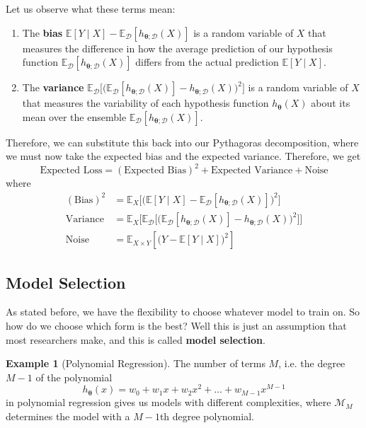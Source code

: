 \documentclass{article}
\theoremstyle{definition}
\newtheorem{example}{Example}[section]
\theoremstyle{remark}
\theoremstyle{definition}
\begin{document}
Let us observe what these terms mean: 
\begin{enumerate}
    \item The \textbf{bias} $\mathbb{E}[Y \mid X] - \mathbb{E}_\mathcal{D} [h_{{\boldsymbol{\theta}}; \mathcal{D}} (X)]$ is a random variable of $X$ that measures the difference in how the average prediction of our hypothesis function $\mathbb{E}_\mathcal{D} [h_{{\boldsymbol{\theta}}; \mathcal{D}} (X)]$ differs from the actual prediction $\mathbb{E}[Y \mid X]$. 

    \item The \textbf{variance} $\mathbb{E}_\mathcal{D} \big[ \big( \mathbb{E}_\mathcal{D} [h_{{\boldsymbol{\theta}}; \mathcal{D}} (X)] - h_{{\boldsymbol{\theta}}; \mathcal{D}} (X) \big)^2 \big]$ is a random variable of $X$ that measures the variability of each hypothesis function $h_{\boldsymbol{\theta}}(X)$ about its mean over the ensemble $\mathbb{E}_\mathcal{D} [h_{{\boldsymbol{\theta}}; \mathcal{D}} (X)]$. 
\end{enumerate}
Therefore, we can substitute this back into our Pythagoras decomposition, where we must now take the expected bias and the expected variance. Therefore, we get 
\[\text{Expected Loss} = (\text{Expected Bias})^2 + \text{Expected Variance} + \text{Noise}\]
where 
\begin{align*}
    (\text{Bias})^2 & = \mathbb{E}_X \big[ \big( \mathbb{E}[Y \mid X] - \mathbb{E}_\mathcal{D} [h_{{\boldsymbol{\theta}}; \mathcal{D}} (X)] \big)^2 \big] \\
    \text{Variance} & = \mathbb{E}_X \big[ \mathbb{E}_\mathcal{D} \big[ \big( \mathbb{E}_\mathcal{D} [h_{{\boldsymbol{\theta}}; \mathcal{D}} (X)] - h_{\boldsymbol{\theta}; \mathcal{D}}(X) \big)^2 \big] \big] \\
    \text{Noise} & = \mathbb{E}_{X \times Y}[\big(Y - \mathbb{E}[Y \mid X]\big)^2]
\end{align*}

\subsection{Model Selection}

As stated before, we have the flexibility to choose whatever model to train on. So how do we choose which form is the best? Well this is just an assumption that most researchers make, and this is called \textbf{model selection}. 

\begin{example}[Polynomial Regression]
The number of terms $M$, i.e. the degree $M-1$ of the polynomial 
\[h_{\boldsymbol{\theta}} (x) = w_0 + w_1 x + w_2 x^2 + \ldots + w_{M-1} x^{M-1}\]
in polynomial regression gives us models with different complexities, where $\mathcal{M}_M$ determines the model with a $M-1$th degree polynomial. 
\end{example}
\end{document}

